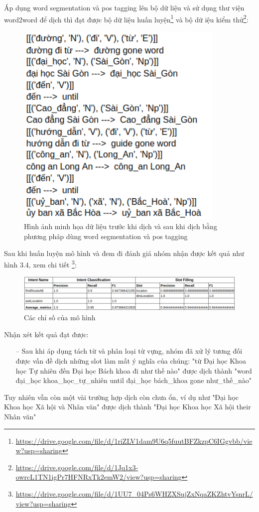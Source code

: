Áp dụng word segmentation và pos tagging lên bộ dữ liệu và sử dụng thư viện word2word để dịch thì đạt được bộ dữ liệu huấn luyện\footnote{\url{https://drive.google.com/file/d/1riZLV1dam9U6q5fuutBFZkzpC6IGgvbb/view?usp=sharing}} và bộ dữ iệu kiểm thử\footnote{	\url{https://drive.google.com/file/d/1Jq1x3-owrcL1TN1igPr7HFNRxTk2emW2/view?usp=sharing}
}:
\begin{figure}[htp]
    \centering
    \includegraphics[width=10cm]{images/trainingdata-wordsegment.png}
    \caption{Hình ảnh minh họa dữ liệu trước khi dịch và sau khi dịch bằng phương pháp dùng word segmentation và pos tagging}
    \label{fig:sodohethongchiduong}
\end{figure}

Sau khi huấn luyện mô hình và đem đi đánh giá nhóm nhận được kết quả như  hình 3.4, xem chi tiết \footnote{\url{https://drive.google.com/file/d/1UU7_04Ps6WHZXSujZxNqaZKZhtvYsnrL/view?usp=sharing}}:

\begin{figure}[htp]
    \centering
    \includegraphics[width=15cm]{images/metrics-dich-tung-t.png}
    \caption{Các chỉ số của mô hình}
    \label{fig:sodohethongchiduong}

\end{figure}

Nhận xét kết quả đạt được:
\begin{itemize}
    \item[--] Sau khi áp dụng tách từ và phân loại từ vựng, nhóm đã xử lý tương đối được vấn đề dịch những slot làm mất ý nghĩa của chúng: "từ Đại học Khoa học Tự nhiên đến Đại học Bách khoa đi như thế nào" được dịch thành "word đại\_học khoa\_học\_tự\_nhiên until đại\_học bách\_khoa gone như\_thế\_nào"
\end{itemize}
Tuy nhiên vẫn còn một vài trường hợp dịch còn chưa ổn, ví dụ như "Đại học Khoa học Xã hội và Nhân văn" được dịch thành "Đại học Khoa học Xã hội their Nhân văn"

